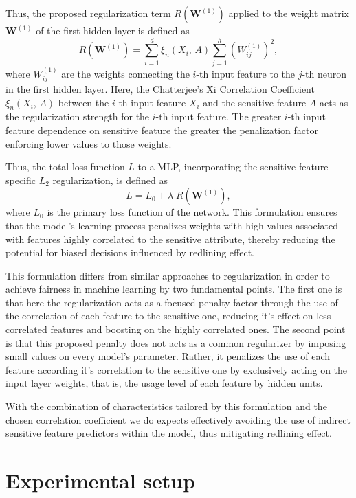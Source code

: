 Thus, the proposed regularization term $R(\mathbf{W}^{(1)})$ applied to the weight matrix $\mathbf{W}^{(1)}$ of the first hidden layer is defined as 
\begin{equation}\label{eq:xi_reg}
R(\mathbf{W}^{(1)}) = \sum_{i=1}^d \xi_n(X_i,\,A) \sum_{j=1}^h (W^{(1)}_{ij})^2,
\end{equation}
where $W^{(1)}_{ij}$ are the weights connecting the $i$-th input feature to the $j$-th neuron in the first hidden layer. Here, the Chatterjee's Xi Correlation Coefficient $\xi_n(X_i,\,A)$ between the $i$-th input feature $X_i$ and the sensitive feature $A$ acts as the regularization strength for the $i$-th input feature. The greater $i$-th input feature dependence on sensitive feature the greater the penalization factor enforcing lower values to those weights.

Thus, the total loss function $L$ to a MLP, incorporating the sensitive-feature-specific $L_2$ regularization, is defined as
\begin{equation}\label{eq:total_regularized_loss}
L = L_0 + \lambda \; R(\mathbf{W}^{(1)}),
\end{equation}
where $L_0$ is the primary loss function of the network. This formulation ensures that the model's learning process penalizes weights with high values associated with features highly correlated to the sensitive attribute, thereby reducing the potential for biased decisions influenced by redlining effect.

This formulation differs from similar approaches to regularization in order to achieve fairness in machine learning by two fundamental points.  The first one is that here the regularization acts as a focused penalty factor through the use of the correlation of each feature to the sensitive one, reducing it's effect on less correlated features and boosting on the highly correlated ones. The second point is that this proposed penalty does not acts as a common regularizer by imposing small values on every model's parameter. Rather, it penalizes the use of each feature according it's correlation to the sensitive one by exclusively acting on the input layer weights, that is, the usage level of each feature by hidden units.

With the combination of characteristics tailored by this formulation and the chosen correlation coefficient we do expects effectively avoiding the use of indirect sensitive feature predictors within the model, thus mitigating redlining effect.

\section{Experimental setup}

